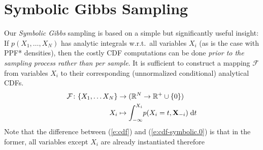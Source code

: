 \documentclass[letterpaper]{article}
\newcommand{\bvec}[1]{\textbf{#1}}
\newcommand{\pr}{p}
\newcommand{\dd}{\;\mathrm{d}} %
\begin{document}
\section{Symbolic Gibbs Sampling}
\label{sect:symbolic.gibbs}

%
Our \emph{Symbolic Gibbs} sampling is based on a simple but significantly useful insight:
If $\pr(X_1, \ldots, X_N)$
has analytic integrals w.r.t.\ all variables $X_i$ (as is the case with PPF* densities),
then the costly CDF computations can be done \emph{prior to the sampling process rather than per sample}. 
It is sufficient to construct a mapping $\mathcal{F}$ from variables $X_i$ to their corresponding (unnormalized conditional) analytical CDFs. 
\begin{align} \footnotesize
 \mathcal{F}\colon \{X_1, \ldots X_N\} &\to (\mathbb{R}^N \to \mathbb{R}^{+} \cup \{0\}) \notag\\
 X_i &\mapsto \int_{-\infty}^{X_i} \! \pr(X_i = t , \bvec{X}_{-i}) \dd  t 
\label{e:cdf-symbolic.0}	
\end{align}
Note that the difference between (\ref{e:cdf}) and (\ref{e:cdf-symbolic.0}) is that in the former, 
all variables except $X_i$ are already instantiated therefore 
\end{document}
